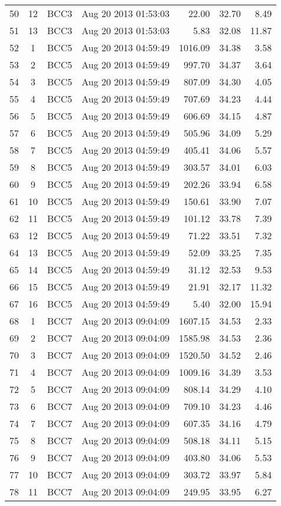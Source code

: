 \begin{longtable}{ccllrrr}
50&12&BCC3&Aug 20 2013 01:53:03&22.00&32.70&8.49\\
51&13&BCC3&Aug 20 2013 01:53:03&5.83&32.08&11.87\\
\hline 
52&1&BCC5&Aug 20 2013 04:59:49&1016.09&34.38&3.58\\
53&2&BCC5&Aug 20 2013 04:59:49&997.70&34.37&3.64\\
54&3&BCC5&Aug 20 2013 04:59:49&807.09&34.30&4.05\\
55&4&BCC5&Aug 20 2013 04:59:49&707.69&34.23&4.44\\
56&5&BCC5&Aug 20 2013 04:59:49&606.69&34.15&4.87\\
57&6&BCC5&Aug 20 2013 04:59:49&505.96&34.09&5.29\\
58&7&BCC5&Aug 20 2013 04:59:49&405.41&34.06&5.57\\
59&8&BCC5&Aug 20 2013 04:59:49&303.57&34.01&6.03\\
60&9&BCC5&Aug 20 2013 04:59:49&202.26&33.94&6.58\\
61&10&BCC5&Aug 20 2013 04:59:49&150.61&33.90&7.07\\
62&11&BCC5&Aug 20 2013 04:59:49&101.12&33.78&7.39\\
63&12&BCC5&Aug 20 2013 04:59:49&71.22&33.51&7.32\\
64&13&BCC5&Aug 20 2013 04:59:49&52.09&33.25&7.35\\
65&14&BCC5&Aug 20 2013 04:59:49&31.12&32.53&9.53\\
66&15&BCC5&Aug 20 2013 04:59:49&21.91&32.17&11.32\\
67&16&BCC5&Aug 20 2013 04:59:49&5.40&32.00&15.94\\
\hline 
68&1&BCC7&Aug 20 2013 09:04:09&1607.15&34.53&2.33\\
69&2&BCC7&Aug 20 2013 09:04:09&1585.98&34.53&2.36\\
70&3&BCC7&Aug 20 2013 09:04:09&1520.50&34.52&2.46\\
71&4&BCC7&Aug 20 2013 09:04:09&1009.16&34.39&3.53\\
72&5&BCC7&Aug 20 2013 09:04:09&808.14&34.29&4.10\\
73&6&BCC7&Aug 20 2013 09:04:09&709.10&34.23&4.46\\
74&7&BCC7&Aug 20 2013 09:04:09&607.35&34.16&4.79\\
75&8&BCC7&Aug 20 2013 09:04:09&508.18&34.11&5.15\\
76&9&BCC7&Aug 20 2013 09:04:09&403.80&34.06&5.53\\
77&10&BCC7&Aug 20 2013 09:04:09&303.72&33.97&5.84\\
78&11&BCC7&Aug 20 2013 09:04:09&249.95&33.95&6.27\\

\end{longtable}
